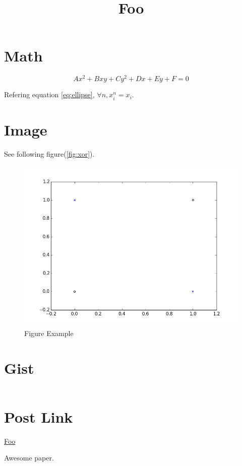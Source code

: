 \documentclass[]{article}
\title{Foo}
\date{}
\begin{document}
\maketitle

\section{Math}\label{math}

\begin{equation}\label{eq:ellipse}
Ax^2 + Bxy + Cy^2 + Dx + Ey + F = 0
\end{equation}

Refering equation \eqref{eq:ellipse}, \(\forall n, x_i^n = x_i\).

\section{Image}\label{image}

See following figure(\autoref{fig:xor}).

\begin{figure}[h]\centering\includegraphics[width=\textwidth]{.//assets/images/xor.png}\caption{Figure Example}\label{fig:xor}\end{figure}

\section{Gist}\label{gist}

\inputminted[mathescape, linenos, frame=lines, framesep=2mm]{Python}{.gist-cache/cache.7aeefc0de1bb10005514355a5c4a5dfe-1c74b8336494cb0e9c6d-xor-5d.py}

\section{Post Link}\label{post-link}

\href{http://localhost:4000/2015/04/29/foo/}{Foo}

Awesome paper\cite{mikolov2013efficient}.




\end{document}
